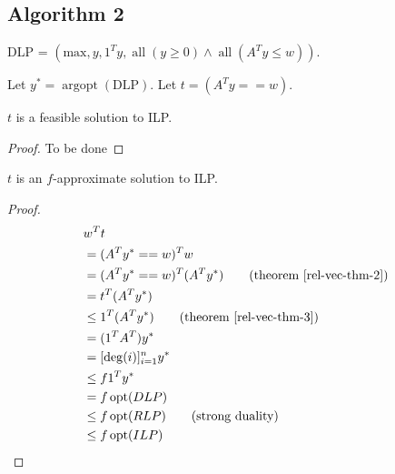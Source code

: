 \subsection{Algorithm 2}

DLP = $(\textrm{max}, y, 1^Ty, \operatorname{all}(y \ge 0) \wedge \operatorname{all}(A^Ty \le w))$.

Let $y^* = \operatorname{argopt}(\textrm{DLP})$.
Let $t = (A^Ty == w)$.

\begin{theorem}
$t$ is a feasible solution to ILP.
\end{theorem}
\begin{proof}
To be done
\end{proof}

\begin{theorem}
$t$ is an $f$-approximate solution to ILP.
\end{theorem}
\begin{proof}
\begin{align*}
& w^Tt
\\ &= (A^Ty^* == w)^Tw
\\ &= (A^Ty^* == w)^T(A^Ty^*) \tag{theorem \ref{rel-vec-thm-2}}
\\ &= t^T(A^Ty^*)
\\ &\le 1^T(A^Ty^*) \tag{theorem \ref{rel-vec-thm-3}}
\\ &= (1^TA^T)y^*
\\ &= [\deg(i)]_{i=1}^n y^*
\\ &\le f 1^Ty^*
\\ &= f \operatorname{opt}(DLP)
\\ &\le f \operatorname{opt}(RLP) \tag{strong duality}
\\ &\le f \operatorname{opt}(ILP)
\end{align*}
\end{proof}


